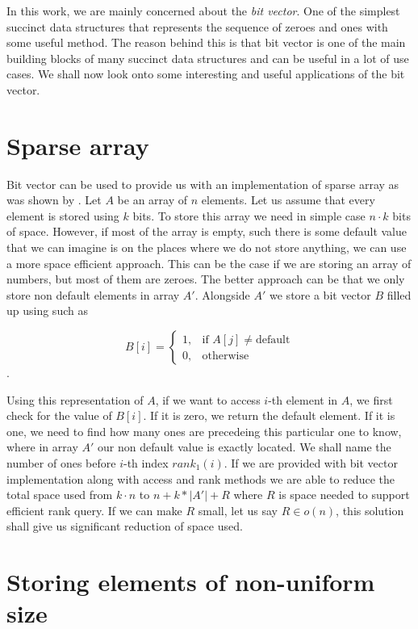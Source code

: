 In this work, we are mainly concerned about the \textit{bit vector}. One of the simplest
succinct data structures that represents the sequence of zeroes and ones with some
useful method. The reason behind this is that bit vector is one of the main building blocks
of many succinct data structures and can be useful in a lot of use cases. We shall now look
onto some interesting and useful applications of the bit vector. 

\section{Sparse array}

Bit vector can be used to provide us with an implementation of sparse array as was shown
by \cite{grossi2013design}. Let $A$ be an array of $n$ elements. Let us assume that every
element is stored using $k$ bits. To store this array we need in simple case $n\cdot k$ bits
of space. However, if most of the array is empty, such there is some default value that we can
imagine is on the places where we do not store anything, we can use a more space efficient
approach. This can be the case if we are storing an array of numbers, but most of them are
zeroes. The better approach can be that we only store non default elements in array $A'$.
Alongside $A'$ we store a bit vector $B$ filled up using such as

\[
    B[i]= 
\begin{cases}
	1,& \text{if } A[j]\neq \text{default} \\
    0,& \text{otherwise}
\end{cases}
\].

Using this representation of $A$, if we want to access $i$-th element in $A$, we first check for
the value of $B[i]$. If it is zero, we return the default element. If it is one, we need to find
how many ones are precedeing this particular one to know, where in array $A'$ our non default
value is exactly located. We shall name the number of ones before $i$-th index $rank_1(i)$. If
we are provided with bit vector implementation along with access and rank methods we are able to
reduce the total space used from $k\cdot n$ to $n+k*|A'|+R$ where $R$ is space needed to support
efficient rank query. If we can make $R$ small, let us say $R\in o(n)$, this solution shall give
us significant reduction of space used.

\section{Storing elements of non-uniform size}

